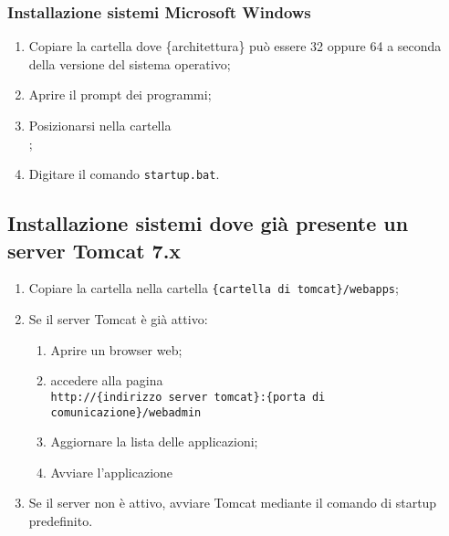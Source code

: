 {{	\subsubsection{Installazione sistemi Microsoft Windows}{
		\begin{enumerate}
			\item Copiare la cartella  dove \{architettura\} può essere 32 oppure 64 a seconda della versione del sistema operativo;
			\item Aprire il prompt dei programmi;
			\item Posizionarsi nella cartella\\ ;
			\item Digitare il comando \texttt{startup.bat}.
		\end{enumerate}
	}

}

\subsection{Installazione sistemi dove già presente un server Tomcat 7.x}{
	\begin{enumerate}
		\item Copiare la cartella  nella cartella \texttt{\{cartella di tomcat\}/webapps};
		\item {Se il server Tomcat è già attivo:
			\begin{enumerate}
				\item Aprire un browser web;
				\item accedere alla pagina\\
				\texttt{http://\{indirizzo server tomcat\}:\{porta di comunicazione\}/webadmin}
				\item Aggiornare la lista delle applicazioni;
				\item Avviare l'applicazione 
			\end{enumerate}
			}
		\item Se il server non è attivo, avviare Tomcat mediante il comando di startup predefinito.
		\end{enumerate}
}

}